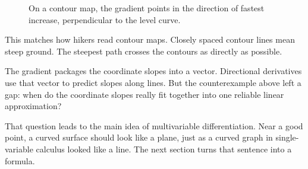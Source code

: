 \begin{figure}[h]
\centering
{}
\caption{On a contour map, the gradient points in the direction of fastest increase,
perpendicular to the level curve.}
\end{figure}

This matches how hikers read contour maps.  Closely spaced contour lines mean steep
ground.  The steepest path crosses the contours as directly as possible.

The gradient packages the coordinate slopes into a vector.  Directional derivatives use
that vector to predict slopes along lines.  But the counterexample above left a gap: when
do the coordinate slopes really fit together into one reliable linear approximation?

That question leads to the main idea of multivariable differentiation.  Near a good point,
a curved surface should look like a plane, just as a curved graph in single-variable
calculus looked like a line.  The next section turns that sentence into a formula.

